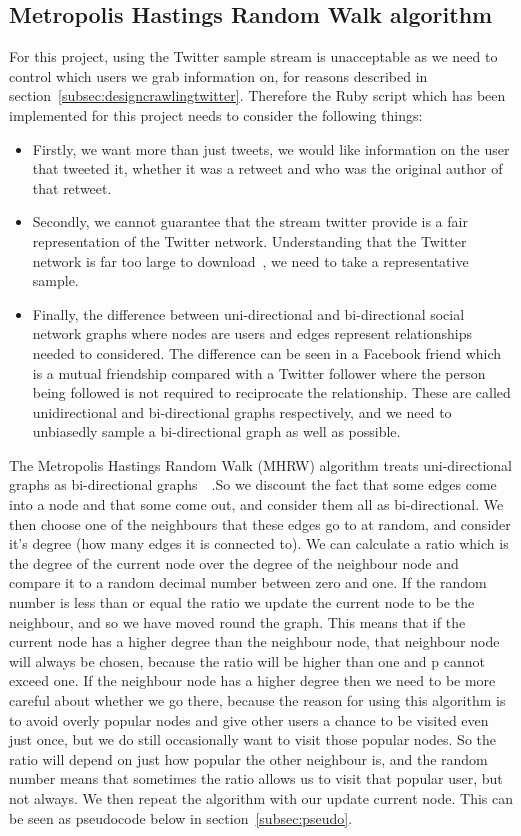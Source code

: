 \documentclass[a4paper]{article}
\begin{document}
\subsection{Metropolis Hastings Random Walk algorithm}
For this project, using the Twitter sample stream is unacceptable as we need to control which users we grab information on, for reasons described in section~\ref{subsec:designcrawlingtwitter}. Therefore the Ruby script which has been implemented for this project needs to consider the following things:
\begin{itemize}
\item Firstly, we want more than just tweets, we would like information on the user that tweeted it, whether it was a retweet and who was the original author of that retweet.
\item Secondly, we cannot guarantee that the stream twitter provide is a fair representation of the Twitter network. Understanding that the Twitter network is far too large to download~\cite{twitterservers}, we need to take a representative sample. 
\item Finally, the difference between uni-directional and bi-directional social network graphs where nodes are users and edges represent relationships needed to considered. The difference can be seen in a Facebook friend which is a mutual friendship compared with a Twitter follower where the person being followed is not required to reciprocate the relationship. These are called unidirectional and bi-directional graphs respectively, and we need to unbiasedly sample a bi-directional graph as well as possible. 
\end{itemize}
The Metropolis Hastings Random Walk (MHRW) algorithm treats uni-directional graphs as bi-directional graphs~\cite{MHRWunidirectional}~\cite{bidirectionaltrawling}.So we discount the fact that some edges come into a node and that some come out, and consider them all as bi-directional. We then choose one of the neighbours that these edges go to at random, and consider it's degree (how many edges it is connected to). We can calculate a ratio which is the degree of the current node over the degree of the neighbour node and compare it to a random decimal number between zero and one. If the random number is less than or equal the ratio we update the current node to be the neighbour, and so we have moved round the graph. This means that if the current node has a higher degree than the neighbour node, that neighbour node will always be chosen, because the ratio will be higher than one and p cannot exceed one. If the neighbour node has a higher degree then we need to be more careful about whether we go there, because the reason for using this algorithm is to avoid overly popular nodes and give other users a chance to be visited even just once, but we do still occasionally want to visit those popular nodes. So the ratio will depend on just how popular the other neighbour is, and the random number means that sometimes the ratio allows us to visit that popular user, but not always. We then repeat the algorithm with our update current node. This can be seen as pseudocode below in section~\ref{subsec:pseudo}.
\end{document}
